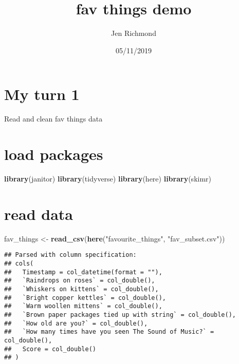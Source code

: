 \documentclass[]{article}
\title{fav things demo}
\author{Jen Richmond}
\date{05/11/2019}
\newenvironment{Shaded}{\begin{snugshade}}{\end{snugshade}}
\newcommand{\KeywordTok}[1]{\textcolor[rgb]{0.13,0.29,0.53}{\textbf{#1}}}
\newcommand{\NormalTok}[1]{#1}
\newcommand{\StringTok}[1]{\textcolor[rgb]{0.31,0.60,0.02}{#1}}
\begin{document}
\maketitle

\hypertarget{my-turn-1}{%
\section{My turn 1}\label{my-turn-1}}

Read and clean fav things data

\hypertarget{load-packages}{%
\section{load packages}\label{load-packages}}

\begin{Shaded}
\begin{Highlighting}[]
\KeywordTok{library}\NormalTok{(janitor)}
\KeywordTok{library}\NormalTok{(tidyverse)}
\KeywordTok{library}\NormalTok{(here)}
\KeywordTok{library}\NormalTok{(skimr)}
\end{Highlighting}
\end{Shaded}

\hypertarget{read-data}{%
\section{read data}\label{read-data}}

\begin{Shaded}
\begin{Highlighting}[]
\NormalTok{fav_things <-}\StringTok{ }\KeywordTok{read_csv}\NormalTok{(}\KeywordTok{here}\NormalTok{(}\StringTok{"favourite_things"}\NormalTok{, }\StringTok{"fav_subset.csv"}\NormalTok{))}
\end{Highlighting}
\end{Shaded}

\begin{verbatim}
## Parsed with column specification:
## cols(
##   Timestamp = col_datetime(format = ""),
##   `Raindrops on roses` = col_double(),
##   `Whiskers on kittens` = col_double(),
##   `Bright copper kettles` = col_double(),
##   `Warm woollen mittens` = col_double(),
##   `Brown paper packages tied up with string` = col_double(),
##   `How old are you?` = col_double(),
##   `How many times have you seen The Sound of Music?` = col_double(),
##   Score = col_double()
## )
\end{verbatim}
\end{document}
